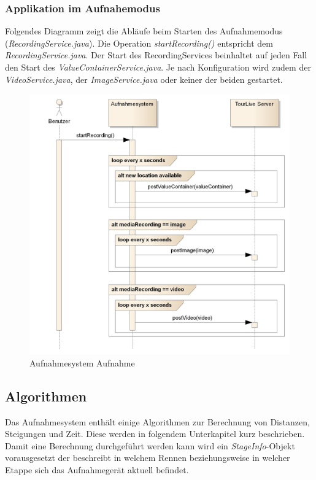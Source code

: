 \pagebreak
\subsubsection{Applikation im Aufnahemodus}
Folgendes Diagramm zeigt die Abläufe beim Starten des Aufnahmemodus (\textit{RecordingService.java}). Die Operation \textit{startRecording()} entspricht dem \textit{RecordingService.java}. Der Start des RecordingServices beinhaltet auf jeden Fall den Start des  \textit{ValueContainerService.java}. Je nach Konfiguration wird zudem der \textit{VideoService.java}, der \textit{ImageService.java} oder keiner der beiden gestartet.

\begin{figure}[H]
	\centering
	\includegraphics[width=150mm]{images/android/recording.jpg}
	\caption{Aufnahmesystem Aufnahme}
\end{figure}

\subsection{Algorithmen}
Das Aufnahmesystem enthält einige Algorithmen zur Berechnung von Distanzen, Steigungen und Zeit. Diese werden in folgendem Unterkapitel kurz beschrieben. Damit eine Berechnung durchgeführt werden kann wird ein \textit{StageInfo}-Objekt vorausgesetzt der beschreibt in welchem Rennen beziehungsweise in welcher Etappe sich das Aufnahmegerät aktuell befindet.
\\

